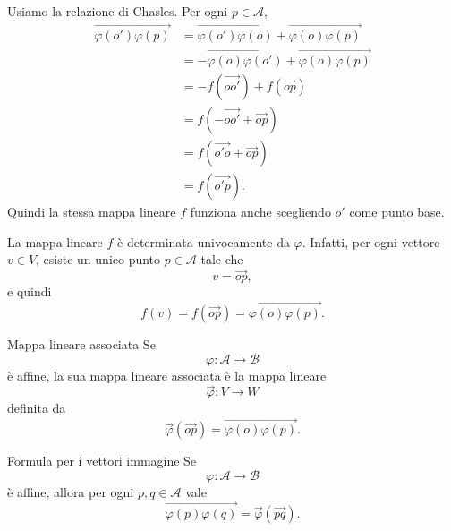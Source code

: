 \documentclass[a4paper]{article}
\begin{document}
\begin{snippetproof}{}
    Usiamo la relazione di Chasles. Per ogni \(p\in\mathcal{A}\),
    \begin{align*}
        \overrightarrow{\varphi(o')\varphi(p)}
        &=
        \overrightarrow{\varphi(o')\varphi(o)}
        +
        \overrightarrow{\varphi(o)\varphi(p)}\\
        &=
        -\overrightarrow{\varphi(o)\varphi(o')}
        +
        \overrightarrow{\varphi(o)\varphi(p)}\\
        &=
        -f(\overrightarrow{oo'})
        +
        f(\overrightarrow{op})\\
        &=
        f(-\overrightarrow{oo'}+\overrightarrow{op})\\
        &=
        f(\overrightarrow{o'o}+\overrightarrow{op})\\
        &=
        f(\overrightarrow{o'p}).
    \end{align*}
    Quindi la stessa mappa lineare \(f\) funziona anche scegliendo \(o'\) come punto base.
\end{snippetproof}

La mappa lineare \(f\) è determinata univocamente da \(\varphi\). Infatti, per ogni vettore \(v\in V\), esiste un unico punto \(p\in\mathcal{A}\) tale che
\[
    v=\overrightarrow{op},
\]
e quindi
\[
    f(v)=f(\overrightarrow{op})
    =
    \overrightarrow{\varphi(o)\varphi(p)}.
\]

\begin{snippetdefinition}{Mappa lineare associata}
    Se
    \[
        \varphi:\mathcal{A}\to\mathcal{B}
    \]
    è affine, la sua mappa lineare associata è la mappa lineare
    \[
        \overrightarrow{\varphi}:V\to W
    \]
    definita da
    \[
        \overrightarrow{\varphi}(\overrightarrow{op})
        =
        \overrightarrow{\varphi(o)\varphi(p)}.
    \]
\end{snippetdefinition}

\begin{snippetproposition}{Formula per i vettori immagine}
    Se
    \[
        \varphi:\mathcal{A}\to\mathcal{B}
    \]
    è affine, allora per ogni \(p,q\in\mathcal{A}\) vale
    \[
        \overrightarrow{\varphi(p)\varphi(q)}
        =
        \overrightarrow{\varphi}(\overrightarrow{pq}).
    \]
\end{snippetproposition}
\end{document}

